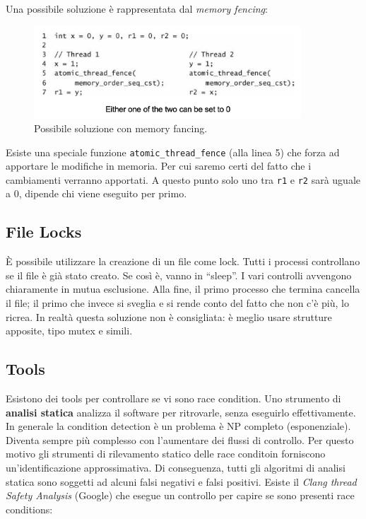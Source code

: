 Una possibile soluzione è rappresentata dal \textit{memory fencing}:

\begin{figure}[H]
    \centering
    \includegraphics[width=10cm, keepaspectratio]{capitoli/secure_coding/img/cap_6/sifance.png}
    \caption{Possibile soluzione con memory fancing.}
\end{figure}

Esiste una speciale funzione \verb|atomic_thread_fence| (alla linea 5) che
forza ad apportare le modifiche in memoria.
Per cui saremo certi del fatto che i cambiamenti verranno apportati.
A questo punto solo uno tra \verb|r1| e \verb|r2| sarà uguale a 0,
dipende chi viene eseguito per primo.


\subsection{File Locks}

È possibile utilizzare la creazione di un file come lock.
Tutti i processi controllano se il file è già stato creato.
Se così è, vanno in “sleep”. I vari controlli avvengono chiaramente in mutua esclusione.
Alla fine, il primo processo che termina cancella il file;
il primo che invece si sveglia e si rende conto del fatto che non c’è più, lo ricrea.
In realtà questa soluzione non è consigliata: è meglio usare strutture apposite, tipo mutex e simili.

\subsection{Tools}

Esistono dei tools per controllare se vi sono race condition.
Uno strumento di \textbf{analisi statica} analizza il software per ritrovarle,
senza eseguirlo effettivamente.
In generale la condition detection è un problema è NP completo (esponenziale).
Diventa sempre più complesso con l’aumentare dei flussi di controllo.
Per questo motivo gli strumenti di rilevamento statico delle race conditoin forniscono
un'identificazione approssimativa.
Di conseguenza, tutti gli algoritmi di analisi statica sono soggetti ad alcuni falsi
negativi e falsi positivi.
Esiste il \textit{Clang thread Safety Analysis} (Google) che esegue un controllo
per capire se sono presenti race conditions:

